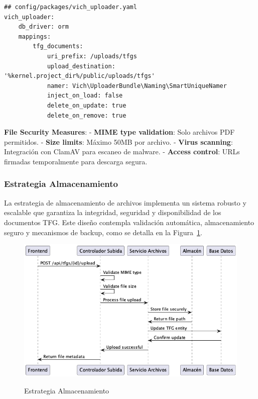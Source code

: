 \documentclass[12pt,a4paper,oneside]{report}
\providecommand{\pandocbounded}[1]{#1}
\begin{document}
\begin{lstlisting}
## config/packages/vich_uploader.yaml
vich_uploader:
    db_driver: orm
    mappings:
        tfg_documents:
            uri_prefix: /uploads/tfgs
            upload_destination: '%kernel.project_dir%/public/uploads/tfgs'
            namer: Vich\UploaderBundle\Naming\SmartUniqueNamer
            inject_on_load: false
            delete_on_update: true
            delete_on_remove: true
\end{lstlisting}

\textbf{File Security Measures}: - \textbf{MIME type validation}: Solo
archivos PDF permitidos. - \textbf{Size limits}: Máximo 50MB por
archivo. - \textbf{Virus scanning}: Integración con ClamAV para escaneo
de malware. - \textbf{Access control}: URLs firmadas temporalmente para
descarga segura.

\subsubsection{Estrategia
Almacenamiento}\label{estrategia-almacenamiento}

La estrategia de almacenamiento de archivos implementa un sistema robusto y escalable que garantiza la integridad, seguridad y disponibilidad de los documentos TFG. Este diseño contempla validación automática, almacenamiento seguro y mecanismos de backup, como se detalla en la Figura~\ref{fig:estrategia-almacenamiento}.

\begin{figure}[H]
\centering
\pandocbounded{\includegraphics[keepaspectratio,alt={Estrategia Almacenamiento}]{processed/images/05_diseno_plantuml_2.png}}
\caption{Estrategia Almacenamiento}
\label{fig:estrategia-almacenamiento}
\end{figure}
\end{document}
